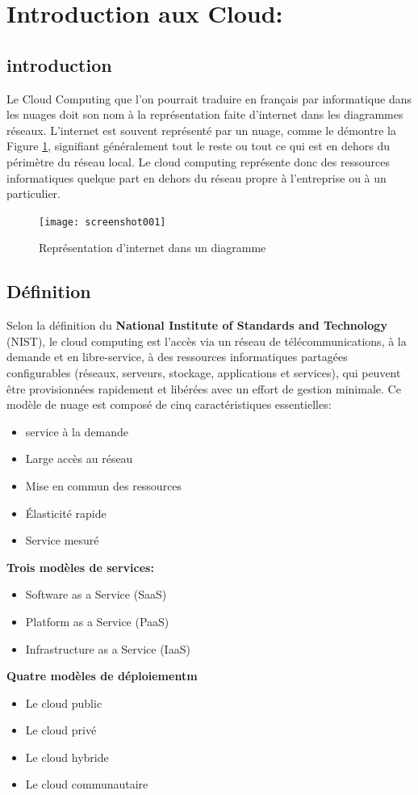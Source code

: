  \section{Introduction aux Cloud:}
 	 \subsection{introduction}
 	  Le  Cloud Computing  que l'on pourrait traduire en français par  informatique dans les nuages doit son nom à la représentation faite d’internet dans les diagrammes réseaux. L’internet est souvent représenté par un nuage, comme le démontre la Figure \ref{fig:x diagramme}, signifiant généralement   tout le reste   ou tout ce qui est en dehors du périmètre du réseau local. Le cloud computing représente donc des ressources informatiques quelque part en dehors du réseau propre à l'entreprise ou à un particulier.
 	

  	\begin{figure}[h]
 	\centering
 	\texttt{[image: screenshot001]}
 	\caption{Représentation d'internet dans un diagramme}
 	\label{fig:x diagramme}
 \end{figure}
 	 \subsection{Définition}
 	Selon la définition du\textbf{ National Institute of Standards and Technology} (NIST), le cloud computing est l'accès via un réseau de télécommunications, à la demande et en libre-service, à des ressources informatiques partagées configurables (réseaux, serveurs, stockage, applications et services), qui peuvent être provisionnées rapidement et libérées avec un effort de gestion minimale. Ce modèle de nuage est composé de cinq caractéristiques essentielles: 
 	\begin{itemize}
 		\item 	service à la demande
 		\item Large accès au réseau
 			\item	Mise en commun des ressources
 		\item	Élasticité rapide
 			\item	Service mesuré 		
 	\end{itemize}
\textbf{ Trois modèles de services:}
  \begin{itemize}
 \item	Software as a Service (SaaS)
 \item	Platform as a Service (PaaS)
 \item	Infrastructure as a Service (IaaS)
  \end{itemize}
\textbf{ Quatre modèles de déploiementm}
 	 \begin{itemize}
 	 	\item Le cloud public
 	 	\item	Le cloud privé
 	 \item	Le cloud hybride
 	 	\item	Le cloud communautaire 
 	 	
 	 \end{itemize}
  
